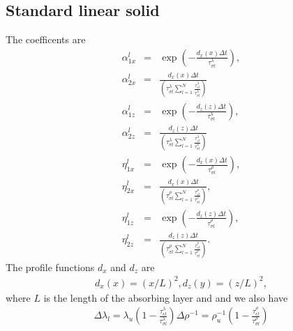 \documentclass[11pt]{article}
\begin{document}
\subsection*{Standard linear solid}
The coefficents are
\begin{eqnarray*}
\alpha^l_{1x}  & = & \exp\left(-\frac{d_x(x)\Delta t}
                          {\tau^{\lambda}_{\sigma l}}\right),        \\
\alpha^l_{2x}  & = & \frac{d_x(x)\Delta t}
                  {(\tau^{\lambda}_{\sigma l}
                   \sum_{l=1}^N \frac{\tau^{\lambda}_{\epsilon l}}
                                     {\tau^{\lambda}_{\sigma l}  })
                  }                                                  \\
\alpha^l_{1z}  & = & \exp\left(-\frac{d_z(z)\Delta t}
                          {\tau^{\lambda}_{\sigma l}}\right),        \\
\alpha^l_{2z}  & = & \frac{d_z(z)\Delta t}
                  {(\tau^{\lambda}_{\sigma l}
                   \sum_{l=1}^N \frac{\tau^{\lambda}_{\epsilon l}}
                                     {\tau^{\lambda}_{\sigma l}  })
                  }                                                  \\
\eta^l_{1x}  & = & \exp\left(-\frac{d_x(x)\Delta t}
                          {\tau^{\rho}_{\sigma l}}\right),           \\
\eta^l_{2x}  & = & \frac{d_x(x)\Delta t}
                  {(\tau^{\rho}_{\sigma l}
                   \sum_{l=1}^N \frac{\tau^{\rho}_{\epsilon l}}
                                     {\tau^{\rho}_{\sigma l}  })
                  },                                                 \\
\eta^l_{1z}  & = & \exp\left(-\frac{d_z(z)\Delta t}
                          {\tau^{\rho}_{\sigma l}}\right),           \\
\eta^l_{2z}  & = & \frac{d_z(z)\Delta t}
                  {(\tau^{\rho}_{\sigma l}
                   \sum_{l=1}^N \frac{\tau^{\rho}_{\epsilon l}}
                                     {\tau^{\rho}_{\sigma l}  })
                  }.
\end{eqnarray*}
The profile functions $d_x$ and $d_z$ are
\begin{eqnarray*}
  d_x(x) = (x/L)^2,
  d_z(y) = (z/L)^2,
\end{eqnarray*}
where $L$ is the length of the absorbing layer and 
and we also have
\begin{eqnarray}
\Delta \lambda_l = \lambda_u\left(1-\frac{\tau^{\lambda}_{\epsilon l}}{\tau^{\lambda}_{\sigma l}}\right)
\Delta \rho^{-1} = \rho^{-1}_u\left(1-\frac{\tau^{\rho}_{\epsilon l}}{\tau^{\rho}_{\sigma l}}\right)
\end{eqnarray}
\end{document}
